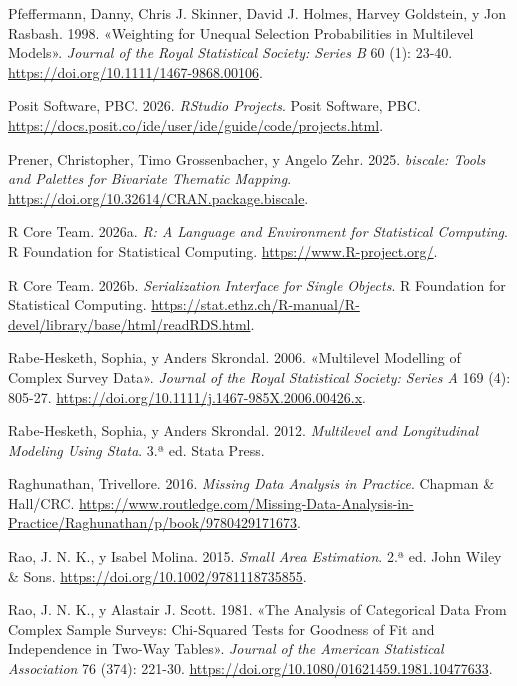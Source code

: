\documentclass[
  spanish,
  11pt,
  letterpaper,
  oneside,
  open=any]{scrbook}
\newlength{\cslhangindent}
\newenvironment{CSLReferences}[2] %
 {\begin{list}{}{%
  \setlength{\itemindent}{0pt}
  \setlength{\leftmargin}{0pt}
  \setlength{\parsep}{0pt}
  \ifodd #1
   \setlength{\leftmargin}{\cslhangindent}
   \setlength{\itemindent}{-1\cslhangindent}
  \fi
  \setlength{\itemsep}{#2\baselineskip}}}
 {\end{list}}
\begin{document}
\begin{CSLReferences}{1}{1}
Pfeffermann, Danny, Chris J. Skinner, David J. Holmes, Harvey Goldstein,
y Jon Rasbash. 1998. {«Weighting for Unequal Selection Probabilities in
Multilevel Models»}. \emph{Journal of the Royal Statistical Society:
Series B} 60 (1): 23-40. \url{https://doi.org/10.1111/1467-9868.00106}.

Posit Software, PBC. 2026. \emph{RStudio Projects}. Posit Software, PBC.
\url{https://docs.posit.co/ide/user/ide/guide/code/projects.html}.

Prener, Christopher, Timo Grossenbacher, y Angelo Zehr. 2025.
\emph{biscale: Tools and Palettes for Bivariate Thematic Mapping}.
\url{https://doi.org/10.32614/CRAN.package.biscale}.

R Core Team. 2026a. \emph{R: A Language and Environment for Statistical
Computing}. R Foundation for Statistical Computing.
\url{https://www.R-project.org/}.

R Core Team. 2026b. \emph{Serialization Interface for Single Objects}. R
Foundation for Statistical Computing.
\url{https://stat.ethz.ch/R-manual/R-devel/library/base/html/readRDS.html}.

Rabe-Hesketh, Sophia, y Anders Skrondal. 2006. {«Multilevel Modelling of
Complex Survey Data»}. \emph{Journal of the Royal Statistical Society:
Series A} 169 (4): 805-27.
\url{https://doi.org/10.1111/j.1467-985X.2006.00426.x}.

Rabe-Hesketh, Sophia, y Anders Skrondal. 2012. \emph{Multilevel and
Longitudinal Modeling Using Stata}. 3.ª ed. Stata Press.

Raghunathan, Trivellore. 2016. \emph{Missing Data Analysis in Practice}.
Chapman \& Hall/CRC.
\url{https://www.routledge.com/Missing-Data-Analysis-in-Practice/Raghunathan/p/book/9780429171673}.

Rao, J. N. K., y Isabel Molina. 2015. \emph{Small Area Estimation}. 2.ª
ed. John Wiley \& Sons. \url{https://doi.org/10.1002/9781118735855}.

Rao, J. N. K., y Alastair J. Scott. 1981. {«The Analysis of Categorical
Data From Complex Sample Surveys: Chi-Squared Tests for Goodness of Fit
and Independence in Two-Way Tables»}. \emph{Journal of the American
Statistical Association} 76 (374): 221-30.
\url{https://doi.org/10.1080/01621459.1981.10477633}.


\end{CSLReferences}
\end{document}
